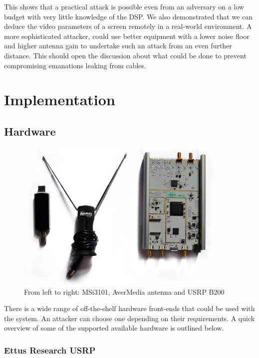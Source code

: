 \documentclass[a4paper,12pt,twoside,openright]{report}
\begin{document}
This shows that a practical attack is possible even from an adversary on a low budget with very little knowledge of the DSP. We also demonstrated that we can deduce the video parameters of a screen remotely in a real-world environment. A more sophisticated attacker, could use better equipment with a lower noise floor and higher antenna gain to undertake such an attack from an even further distance. This should open the discussion about what could be done to prevent compromising emanations leaking from cables.

\chapter{Implementation} 

\section{Hardware}
\label{sec:hw} 

\begin{figure}[h!]
 
  \centering
    \includegraphics[width=0.9\textwidth]{equipment}
    \caption{From left to right: MSi3101, AverMedia antenna and USRP B200}
\end{figure}

There is a wide range of off-the-shelf hardware front-ends that could be used with the system. An attacker can choose one depending on their requirements. A quick overview of some of the supported available hardware is outlined below.

\subsection{Ettus Research USRP}
\end{document}
